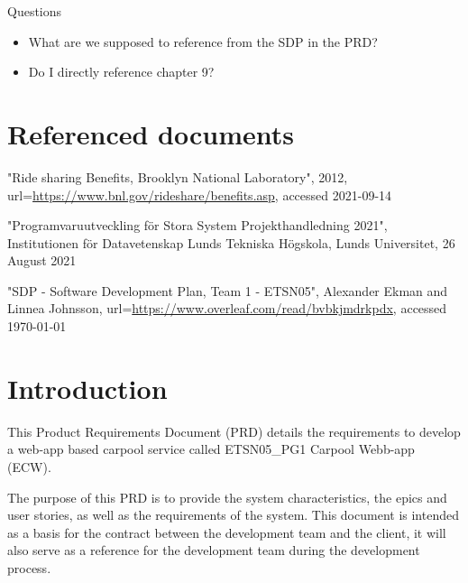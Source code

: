 \documentclass{article}
\newcommand{\nameNospace}{ECW}
\begin{document}
Questions
\begin{itemize}
    \item What are we supposed to reference from the SDP in the PRD?
    \item Do I directly reference chapter 9?
\end{itemize}

\newpage

\section{Referenced documents}
\begin{thebibliography}{widest entry}
     "Ride sharing Benefits, Brooklyn National Laboratory", 2012, url=\url{https://www.bnl.gov/rideshare/benefits.asp}, accessed 2021-09-14
    
     "Programvaruutveckling för Stora System Projekthandledning 2021", Institutionen för Datavetenskap Lunds Tekniska Högskola, Lunds Universitet, 26 August 2021
    
     "SDP - Software Development Plan, Team 1 - ETSN05", Alexander Ekman and Linnea Johnsson, url=\url{https://www.overleaf.com/read/bvbkjmdrkpdx}, accessed \today
    
\end{thebibliography}

\section{Introduction}\label{sec:intro}
This Product Requirements Document (PRD) details the requirements to develop a web-app based carpool service called ETSN05\_PG1 Carpool Webb-app (\nameNospace).

The purpose of this PRD is to provide the system characteristics, the epics and user stories, as well as the requirements of the system. This document is intended as a basis for the contract between the development team and the client, it will also serve as a reference for the development team during the development process.
\end{document}
